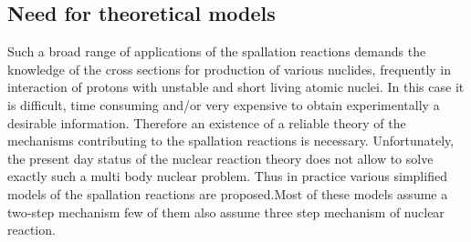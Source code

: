 	\subsection{Need for theoretical models}
	Such a broad range of applications of the spallation reactions demands the knowledge of the cross sections for production of various nuclides, frequently in interaction of protons with unstable and short living atomic nuclei. In this case it is difficult, time consuming and/or very expensive to obtain experimentally a desirable information. Therefore an existence of a reliable theory of the mechanisms contributing to the spallation reactions is necessary. Unfortunately, the present day status of the nuclear reaction theory does not allow to solve exactly such a multi body nuclear problem. Thus in practice various simplified models of the spallation reactions are proposed.Most of these models assume a two-step mechanism few of them also assume three step mechanism of nuclear reaction.

